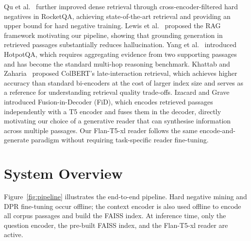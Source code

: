 \documentclass{llncs}
\begin{document}
Qu et al.~\cite{qu2021rocketqa} further improved dense retrieval through
cross-encoder-filtered hard negatives in RocketQA, achieving
state-of-the-art retrieval and providing an upper bound for hard negative
training. Lewis et al.~\cite{lewis2020rag} proposed the RAG framework
motivating our pipeline, showing that grounding generation in retrieved
passages substantially reduces hallucination. Yang et
al.~\cite{yang2018hotpotqa} introduced HotpotQA, which requires aggregating
evidence from two supporting passages and has become the standard multi-hop
reasoning benchmark. Khattab and Zaharia~\cite{khattab2020colbert} proposed
ColBERT's late-interaction retrieval, which achieves higher accuracy than
standard bi-encoders at the cost of larger index size and serves as a
reference for understanding retrieval quality trade-offs.
Izacard and Grave~\cite{izacard2021fid} introduced Fusion-in-Decoder (FiD),
which encodes retrieved passages independently with a T5 encoder and fuses
them in the decoder, directly motivating our choice of a generative reader
that can synthesise information across multiple passages. Our Flan-T5-xl
reader follows the same encode-and-generate paradigm without requiring
task-specific reader fine-tuning.

\section{System Overview}

Figure~\ref{fig:pipeline} illustrates the end-to-end pipeline. Hard
negative mining and DPR fine-tuning occur offline; the context encoder is
also used offline to encode all corpus passages and build the FAISS index.
At inference time, only the question encoder, the pre-built FAISS index,
and the Flan-T5-xl reader are active.
\end{document}
